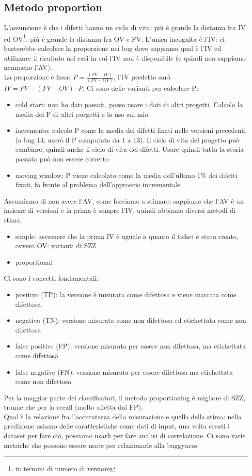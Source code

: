 \documentclass{article}
\begin{document}
\subsection{Metodo proportion}
L'assunzione è che i difetti hanno un ciclo di vita: più è grande la distanza fra IV ed OV\footnote{in termini di numero di versioni}, più è grande la distanza fra OV e FV. L'unica incognita è l'IV: ci basterebbe calcolare la proporzione nei bug dove sappiamo qual è l'IV ed utilizzare il risultato nei casi in cui l'IV non è disponibile (e quindi non sappiamo nemmeno l'AV).\\ La proporzione è  fissa: $P = \frac{(FV - IV)}{(FV - OV)}$, l'IV predetto sarà $IV = FV - (FV - OV)\cdot P$. Ci sono delle varianti per calcolare P:
\begin{itemize}
\item cold start: non ho dati passati, posso usare i dati di altri progetti. Calcolo la media dei P di altri porgetti e lo uso sul mio
\item incremento: calcolo P come la media dei difetti fixati nelle versioni precedenti (a bug 14, userò il P computato da 1 a 13). Il ciclo di vita del progetto può cambiare, quindi anche il ciclo di vita dei difetti. Usare quindi tutta la storia passata può non essere corretto
\item moving window: P viene calcolato come la media dell'ultimo 1\% dei difetti fixati, fa fronte al problema dell'approccio incrementale.
\end{itemize}
Assumiamo di non avere l'AV, come facciamo a stimare: sappiamo che l'AV è un insieme di versioni e la prima è sempre l'IV, quindi abbiamo diversi metodi di stima:
\begin{itemize}
\item simple: assumere che la prima IV è uguale a quanto il ticket è stato creato, ovvero OV; varianti di SZZ
\item proportional
\end{itemize}
Ci sono i concetti fondamentali:
\begin{itemize}
\item positivo (TP): la versione è misurata come difettosa e viene marcata come difettosa
\item negativo (TN): versione misurata come non difettosa ed etichettata come non difettosa
\item false positive (FP): versione misurata per essere non difettosa, ma etichettata come difettosa
\item false negative (FN): versione misurata per essere difettosa ma etichettata come non difettosa
\end{itemize}
Per la maggior parte dei classificatori, il metodo proportioning è migliore di SZZ, tranne che per la recall (molto affetta dai FP).\\ Qual è la relazione fra l'accuratezza della misurazione e quella della stima: nella predizione usiamo delle caratteristiche come dati di input, una volta creati i dataset per fare ciò, possiamo usarli per fare analisi di correlazione. Ci sono varie metriche che possono essere usate per relazionarle alla buggyness.
\end{document}
